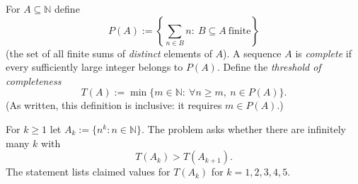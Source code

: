 For $A\subseteq\mathbb{N}$ define
\[
P(A):=\left\{\sum_{n\in B} n:\ B\subseteq A\ \text{finite}\right\}
\]
(the set of all finite sums of \emph{distinct} elements of $A$).
A sequence $A$ is \emph{complete} if every sufficiently large integer belongs to $P(A)$.
Define the \emph{threshold of completeness}
\[
T(A):=\min\{m\in\mathbb{N}:\ \forall n\ge m,\ n\in P(A)\}.
\]
(As written, this definition is inclusive: it requires $m\in P(A)$.)

For $k\ge 1$ let $A_k:=\{n^k: n\in\mathbb{N}\}$. The problem asks whether there are infinitely many $k$ with
\[
T(A_k) > T(A_{k+1}).
\]
The statement lists claimed values for $T(A_k)$ for $k=1,2,3,4,5$.
